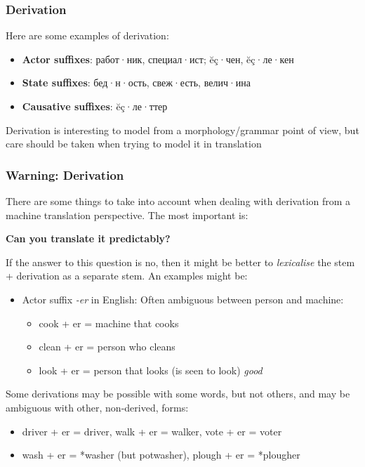 \documentclass[10pt,xetex]{beamer} %
\begin{document}
\begin{frame}
  \frametitle{Derivation}


Here are some examples of derivation:

\begin{itemize}
  \item {\bf Actor suffixes}: работ·ник, специал·ист; ĕç·чен, ĕç·ле·кен %
  \item {\bf State suffixes}: бед·н·ость, свеж·есть, велич·ина %
  \item {\bf Causative suffixes}: ĕç·ле·ттер %
\end{itemize}

Derivation is interesting to model from a morphology/grammar point of view,
but care should be taken when trying to model it in translation

\end{frame}

\begin{frame}
  \frametitle{Warning: Derivation}

There are some things to take into account when dealing with derivation from
a machine translation perspective. The most important is:

\begin{center}
   {\bf Can you translate it predictably?}
\end{center}

If the answer to this question is no, then it might be better to {\em lexicalise}
the stem + derivation as a separate stem. An examples might be:

\begin{itemize}
  \item Actor suffix {\em -er} in English: Often ambiguous between person and machine:
  \begin{itemize}
     \item cook + er = machine that cooks
     \item clean + er = person who cleans
     \item look + er = person that looks (is seen to look) {\em good}
  \end{itemize}
\end{itemize}

Some derivations may be possible with some words, but not others, and may be ambiguous with other, non-derived, forms:

\begin{itemize}
  \item driver + er = driver, walk + er = walker, vote + er = voter
  \item wash + er = *washer (but potwasher), plough + er = *plougher
\end{itemize}

\end{frame}
\end{document}
